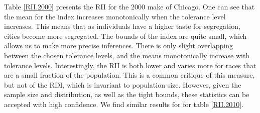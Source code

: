 \documentclass[11pt]{asaproc}
\newcommand{\1}{\mathbb{1}}
\begin{document}
Table \ref{RII.2000} presents the RII for the 2000 make of Chicago. One can see that the mean for the index increases monotonically when the tolerance level increases. This means that as individuals have a higher taste for segregation, cities become more segregated. The bounds of the index are quite small, which allows us to make more precise inferences. There is only slight overlapping between the chosen tolerance levels, and the means monotonically increase with tolerance levels. Interestingly, the RII is both lower and varies more for races that are a small fraction of the population. This is a common critique of this measure, but not of the RDI, which is invariant to population size. However, given the sample size and distribution, as well as the tight bounds, these statistics can be accepted with high confidence. We find similar results for for table \ref{RII.2010}.
\end{document}
